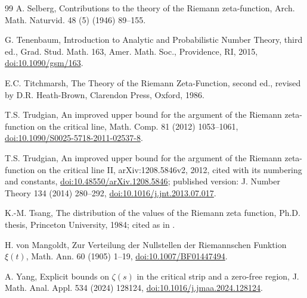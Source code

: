 \documentclass[11pt,a4paper]{article}
\makeatletter
\numberwithin{equation}{section}
\DeclareRobustCommand{\CGcite}[2][]{\if\relax\detokenize{#1}\relax\cite{#2}\else\cite[#1]{#2}\fi}
\newcommand{\CG@getbib}[1]{\@ifundefined{CGBib@#1}{#1}{\csname CGBib@#1\endcsname}}
\DeclareRobustCommand{\CGcite}[2][]{\pdftooltip{\if\relax\detokenize{#1}\relax\cite{#2}\else\cite[#1]{#2}\fi}{\CG@getbib{#2}}}
\theoremstyle{definition}
\theoremstyle{remark}
\makeatother
\begin{document}
\begin{thebibliography}{99}
 A. Selberg, Contributions to the theory of the Riemann zeta-function, Arch. Math. Naturvid. 48 (5) (1946) 89--155.

 G. Tenenbaum, Introduction to Analytic and Probabilistic Number Theory, third ed., Grad. Stud. Math. 163, Amer. Math. Soc., Providence, RI, 2015, \href{https://doi.org/10.1090/gsm/163}{doi:10.1090/gsm/163}.

 E.C. Titchmarsh, The Theory of the Riemann Zeta-Function, second ed., revised by D.R. Heath-Brown, Clarendon Press, Oxford, 1986.

 T.S. Trudgian, An improved upper bound for the argument of the Riemann zeta-function on the critical line, Math. Comp. 81 (2012) 1053--1061, \href{https://doi.org/10.1090/S0025-5718-2011-02537-8}{doi:10.1090/S0025-5718-2011-02537-8}.

 T.S. Trudgian, An improved upper bound for the argument of the Riemann zeta-function on the critical line II, arXiv:1208.5846v2, 2012, cited with its numbering and constants, \href{https://doi.org/10.48550/arXiv.1208.5846}{doi:10.48550/arXiv.1208.5846}; published version: J. Number Theory 134 (2014) 280--292, \href{https://doi.org/10.1016/j.jnt.2013.07.017}{doi:10.1016/j.jnt.2013.07.017}.

 K.-M. Tsang, The distribution of the values of the Riemann zeta function, Ph.D. thesis, Princeton University, 1984; cited as in \CGcite[\S3]{FazzariGerspachMinelli2025}.

 H. von Mangoldt, Zur Verteilung der Nullstellen der Riemannschen Funktion $\xi(t)$, Math. Ann. 60 (1905) 1--19, \href{https://doi.org/10.1007/BF01447494}{doi:10.1007/BF01447494}.

 A. Yang, Explicit bounds on $\zeta(s)$ in the critical strip and a zero-free region, J. Math. Anal. Appl. 534 (2024) 128124, \href{https://doi.org/10.1016/j.jmaa.2024.128124}{doi:10.1016/j.jmaa.2024.128124}.

\end{thebibliography}
\end{document}
